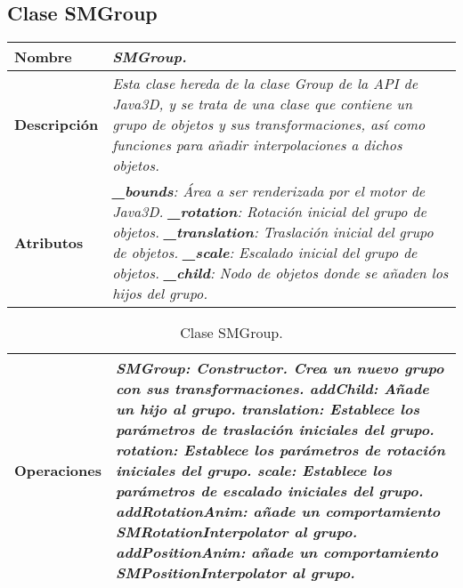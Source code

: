       \subsection{Clase SMGroup}
         \begin{table}[H]
            \centering
            \begin{tabular}{|p{4cm}|p{11.5cm}|}
            \hline
            \textbf{Nombre} & \textit{SMGroup.}\\ \hline
            \textbf{Descripción} & \textit{Esta clase hereda de la clase Group de la API de Java3D, y se trata de una clase
                                    que contiene un grupo de objetos y sus transformaciones, así como funciones para añadir
                                    interpolaciones a dichos objetos.}\\ \hline
            \textbf{Atributos} & \textit{\textbf{\_bounds}: Área a ser renderizada por el motor de Java3D.}\newline
                                 \textit{\textbf{\_rotation}: Rotación inicial del grupo de objetos.}\newline
                                 \textit{\textbf{\_translation}: Traslación inicial del grupo de objetos.}\newline
                                 \textit{\textbf{\_scale}: Escalado inicial del grupo de objetos.}\newline
                                 \textit{\textbf{\_child}: Nodo de objetos donde se añaden los hijos del grupo.}\\ \hline
            \end{tabular}
         \end{table}
         \begin{table}[h]
            \begin{tabular}{|p{4cm}|p{11.5cm}|}
            \hline
            \textbf{Operaciones} & \textit{\textbf{SMGroup}: Constructor. Crea un nuevo grupo con sus transformaciones.}\newline
                                    \textit{\textbf{addChild}: Añade un hijo al grupo.}\newline
                                    \textit{\textbf{translation}: Establece los parámetros de traslación iniciales del grupo.}\newline
                                    \textit{\textbf{rotation}: Establece los parámetros de rotación iniciales del grupo.}\newline
                                    \textit{\textbf{scale}: Establece los parámetros de escalado iniciales del grupo.}\newline
                                    \textit{\textbf{addRotationAnim}: añade un comportamiento SMRotationInterpolator al grupo.}\newline
                                    \textit{\textbf{addPositionAnim}: añade un comportamiento SMPositionInterpolator al grupo.}\\ \hline
            \end{tabular}
            \caption{Clase SMGroup.}
         \end{table}
